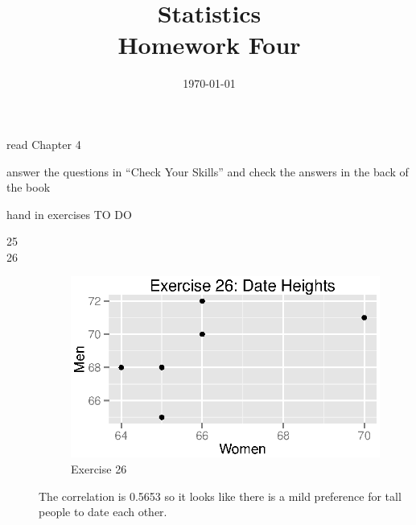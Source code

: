 \documentclass{exam}
\author{}
\date{\today}
\title{Statistics \\ Homework Four}
\begin{document}
  \maketitle

  \ifprintanswers
  \else
    \begin{itemize*}
      \item read Chapter 4 
      \item answer the questions in ``Check Your Skills'' and check the answers in the
        back of the book
      \item hand in exercises TO DO
    \end{itemize*}
  \fi

  \ifprintanswers
    \begin{description}
      \item[25]     
    
      \item[26]
        \begin{figure}[H]
          \centering
          \includegraphics{figures/ex26.eps}
          \caption{Exercise 26}
        \end{figure}

        The correlation is 0.5653 so it looks like there is a mild preference
        for tall people to date each other.


\end{description}
\end{document}
